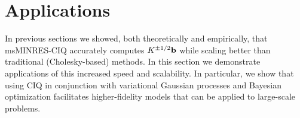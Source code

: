 \section{Applications}

In previous sections we showed, both theoretically and empirically, that msMINRES-CIQ accurately computes $K^{\pm1/2} \mathbf{b}$ while scaling better than traditional (Cholesky-based) methods.
In this section we demonstrate applications of this increased speed and scalability.
In particular, we show that using CIQ in conjunction with variational Gaussian processes and Bayesian optimization facilitates higher-fidelity models that can be applied to large-scale problems.
